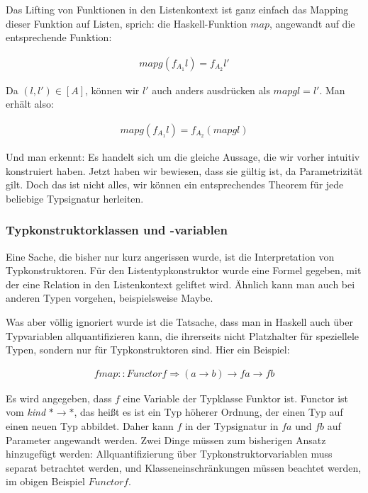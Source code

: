 \documentclass[11pt]{article} %
\begin{document}
Das Lifting von Funktionen in den Listenkontext ist ganz einfach das Mapping dieser Funktion auf Listen, sprich: die Haskell-Funktion
$map$, angewandt auf die entsprechende Funktion:

\begin{align}
map g (f_{A_1} l) = f_{A_2} l'
\end{align}

Da $(l, l') \in [A]$, können wir $l'$ auch anders ausdrücken als $map g l = l'$. Man erhält also:

\begin{align}
map g (f_{A_1} l) = f_{A_2} (map g l)
\end{align}

Und man erkennt: Es handelt sich um die gleiche Aussage, die wir vorher intuitiv konstruiert haben. Jetzt haben wir bewiesen,
dass sie gültig ist, da Parametrizität gilt. Doch das ist nicht alles, wir können ein entsprechendes Theorem für jede beliebige
Typsignatur herleiten.

\subsubsection{Typkonstruktorklassen und -variablen}

Eine Sache, die bisher nur kurz angerissen wurde, ist die Interpretation von Typkonstruktoren. Für den Listentypkonstruktor
wurde eine Formel gegeben, mit der eine Relation in den Listenkontext geliftet wird. Ähnlich kann man auch bei anderen Typen
vorgehen, beispielsweise Maybe.

Was aber völlig ignoriert wurde ist die Tatsache, dass man in Haskell auch über Typvariablen allquantifizieren kann, die ihrerseits
nicht Platzhalter für speziellele Typen, sondern nur für Typkonstruktoren sind. Hier ein Beispiel:

\begin{align*}
fmap :: Functor f \Rightarrow (a \rightarrow b) \rightarrow f a \rightarrow f b
\end{align*}

Es wird angegeben, dass $f$ eine Variable der Typklasse Funktor ist. Functor ist vom \textit{kind} $* \rightarrow *$, das heißt es
ist ein Typ höherer Ordnung, der einen Typ auf einen neuen Typ abbildet. Daher kann $f$ in der Typsignatur in $f a$ und $f b$ auf
Parameter angewandt werden.
Zwei Dinge müssen zum bisherigen Ansatz hinzugefügt werden: Allquantifizierung über Typkonstruktorvariablen muss separat betrachtet werden, und Klasseneinschränkungen müssen beachtet werden, im obigen Beispiel $Functor f$.
\end{document}
